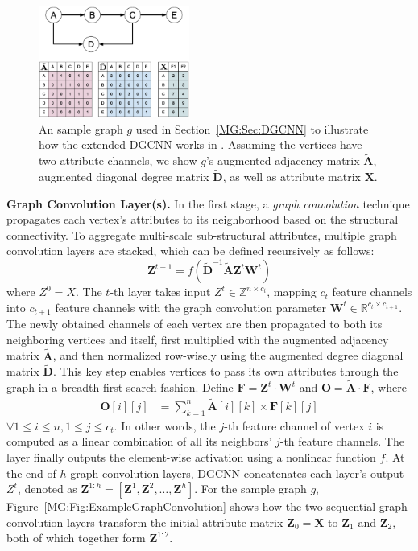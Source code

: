 \begin{figure}[htbp]
\centerline{\includegraphics[width=0.44\textwidth]{Magic/figures/ExampleGraph.eps}}
\caption{An sample graph $g$ used in Section~\ref{MG:Sec:DGCNN} to illustrate how the extended DGCNN works in \sysname.
Assuming the vertices have two attribute channels, we show
$g$'s augmented adjacency matrix $\tilde{\mathbf{A}}$, augmented diagonal degree matrix $\tilde{\mathbf{D}}$,
as well as attribute matrix $\mathbf{X}$.}
\label{MG:Fig:ExampleGraph}
\end{figure}

\textbf{Graph Convolution Layer(s).} In the first stage, a \textit{graph convolution} technique propagates each vertex's attributes to its neighborhood based on the structural connectivity.
To aggregate multi-scale sub-structural attributes, multiple graph
convolution layers are stacked, which can be defined recursively as follows:
\begin{equation}
    \mathbf{Z}^{t + 1} = f(\tilde{\mathbf{D}}^{-1} \tilde{\mathbf{A}} \mathbf{Z}^t \mathbf{W}^t)
\end{equation}
where $Z^0 = X$. The $t$-th layer takes input $Z^t \in \mathbb{Z}^{n \times c_t}$,
mapping $c_t$ feature channels into $c_{t+1}$ feature channels with the graph convolution parameter $\mathbf{W}^t \in \mathbb{R}^{c_t \times c_{t+1}}$.
The newly obtained channels of each vertex are then propagated to both its neighboring vertices and itself,
 first multiplied with the augmented adjacency matrix $\tilde{\mathbf{A}}$,
and then normalized row-wisely using the augmented degree diagonal matrix $\tilde{\mathbf{D}}$.
This key step enables vertices to pass its own attributes through the graph in a breadth-first-search fashion. %
Define $\mathbf{F} = \mathbf{Z}^t \cdot \mathbf{W}^t$ and $\mathbf{O} = \tilde{\mathbf{A}} \cdot \mathbf{F}$, where
\begin{align}
    \mathbf{O}[i][j] &= \sum_{k = 1}^{n} \tilde{\mathbf{A}}[i][k] \times \mathbf{F}[k][j]
\end{align}
$\forall 1\leq i \leq n, 1 \leq j \leq c_t$.
In other words, the $j$-th feature channel of vertex $i$ is computed as a linear combination of all its neighbors' $j$-th feature channels.
The layer finally outputs the element-wise activation using a nonlinear function $f$.
At the end of $h$ graph convolution layers, DGCNN concatenates each layer's output $Z^{t}$,
denoted as $\mathbf{Z}^{1:h} = [\mathbf{Z}^1, \mathbf{Z}^2, \ldots, \mathbf{Z}^{h}]$.
For the sample graph $g$, Figure~\ref{MG:Fig:ExampleGraphConvolution} shows how the two sequential graph convolution layers transform the initial attribute matrix $\mathbf{Z}_0=\mathbf{X}$ to $\mathbf{Z}_1$ and $\mathbf{Z}_2$, both of which together form $\mathbf{Z}^{1:2}$.

